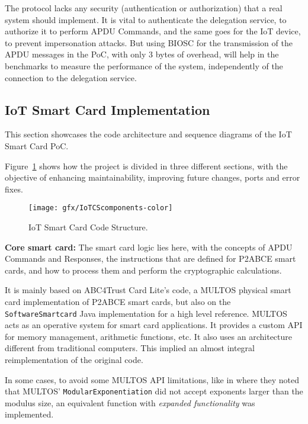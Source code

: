 The protocol lacks any security (authentication or authorization) that a real system should implement. It is vital to authenticate the delegation service, to authorize it to perform APDU Commands, and the same goes for the IoT device, to prevent impersonation attacks. But using BIOSC for the transmission of the APDU messages in the PoC, with only 3 bytes of overhead, will help in the  benchmarks to measure the performance of the system, independently of the connection to the delegation service.


\subsection{IoT Smart Card Implementation}

This section showcases the code architecture and sequence diagrams of the IoT Smart Card PoC.

%

Figure~\ref{fig:IoTCScomponents-color} shows how the project is divided in three different sections, with the objective of enhancing maintainability, improving future changes, ports and error fixes.


\begin{figure}[bth]
	\centering
	\texttt{[image: gfx/IoTCScomponents-color]}
	\caption{IoT Smart Card Code Structure.}
	\label{fig:IoTCScomponents-color}
\end{figure}


\textbf{Core smart card:} The smart card logic lies here, with the concepts of APDU Commands and Responses, the instructions that are defined for P2ABCE smart cards, and how to process them and perform the cryptographic calculations.

It is mainly based on ABC4Trust Card Lite's code, a MULTOS physical smart card implementation of P2ABCE smart cards, but also on the \texttt{SoftwareSmartcard} Java implementation for a high level reference. MULTOS acts as an operative system for smart card applications. It provides a custom API for memory management, arithmetic functions, etc. It also uses an architecture different from traditional computers. This implied an almost integral reimplementation of the original code.

In some cases, to  avoid some MULTOS API limitations, like in \cite{vullers2013efficient} where they noted that MULTOS' \texttt{ModularExponentiation} did not accept exponents larger than the modulus size, an equivalent function with \textit{expanded functionality} was implemented. 

